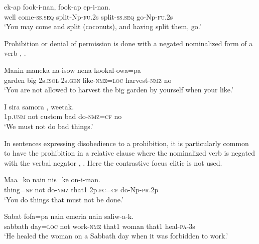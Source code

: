 \ea%
\label{ex:6:x1086}
\gll {}  ek-ap  fook-i-nan,  fook-ap  ep-i-nan. \\
well  come-\textsc{ss}.\textsc{seq}  split-Np-\textsc{fu}.2s  split-\textsc{ss}.\textsc{seq}  go-Np-\textsc{fu}.2s\\
\glt `You may come and split (coconuts), and having split them, go.'
\z

Prohibition or denial of permission is done with a negated nominalized form of a verb , .

\ea%
\label{ex:6:x1087}
\gll Manin  maneka  na-isow  nena  kookal-owa=pa    \\
garden  big  2s.\textsc{isol}  2s.\textsc{gen}  like-\textsc{nmz}=\textsc{loc}  harvest-\textsc{nmz} no\\
\glt `You are not allowed to harvest the big garden by yourself when your like.'
\z

\ea%
\label{ex:6:x1078}
\gll I    sira  samora  , weetak.\\
1p.\textsc{unm}  not  custom  bad  do-\textsc{nmz}=\textsc{cf}  no\\
\glt `We must not do bad things.'
\z

In sentences expressing disobedience to a prohibition, it is particularly common to have the prohibition in a relative clause where the nominalized verb is negated with the verbal negator  , . Here the contrastive focus clitic is not used. 

\ea%
\label{ex:6:x1887}
\gll Maa=ko  {\ob}    nain{\cb}  nis=ke  on-i-man. \\
thing=\textsc{nf}  not  do-\textsc{nmz}  that1  2p.\textsc{fc}=\textsc{cf}  do-Np-\textsc{pr}.2p\\
\glt `You do things that must not be done.'
\z

\ea%
\label{ex:6:x1888}
\gll Sabat  fofa=pa  {\ob}    nain{\cb}  emeria  nain  saliw-a-k. \\
sabbath  day=\textsc{loc}  not  work-\textsc{nmz}  that1  woman  that1  heal-\textsc{pa}-3s\\
\glt `He healed the woman on a Sabbath day when it was forbidden to work.'
\z

